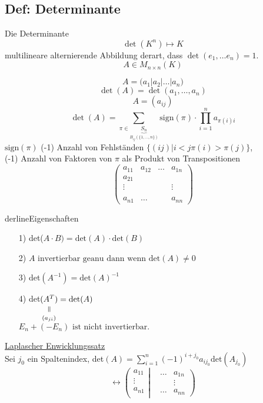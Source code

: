 \documentclass[titlepage,12pt,a4paper,ngerman]{report}
\newcommand{\verteq}{\rotatebox{90}{$\,=$}}
\newcommand{\equalto}[2]{\underset{\scriptstyle\overset{\mkern4mu\verteq}{#2}}{#1}}
\newcommand{\tx}[1]{\textrm{#1}}
\begin{document}
\subsection{Def: Determinante} Die Determinante $$\det(K^n) \mapsto K$$ multilineare alternierende Abbildung derart, dass $\det(e_1,\dots e_n) = 1$.
$$A\in M_{n\times n}(K)$$

$$A  = \Bigg( a_1 \bigg\vert a_2\bigg\vert \dots \bigg\vert a_n\Bigg) $$
$$ \det(A) = \det(a_1,\dots , a_n)$$
$$A=(a_{ij})$$
$$\det(A) = \sum_{\pi \in \underbrace{S_n}_{B_{ij}(\{1,\dots ,n\})}} \tx{sign}(\pi) \cdot \prod _{i = 1}^n a_{\pi(i)i}$$
$\tx{sign}(\pi)$ (-1) Anzahl von Fehlständen $\{(ij)\vert i<j \pi(i) >\pi(j)\}$, \\
(-1) Anzahl von Faktoren von $\pi$ als Produkt von Transpositionen\\


$$\begin{pmatrix}
a_{11} & a_{12} & \dots & a_{1n} \\
a_{21} &  &  &  \\
\vdots &  &  & \vdots \\
&  &  &  \\
a_{n1} & \dots &  & a_{nn} 
\end{pmatrix}$$

derline{Eigenschaften}\\
\begin{itemize}
	\item[1)] det($A \cdot B) = \textrm{det}(A) \cdot \textrm{det}(B)$
	\item[2)] $A \textrm{ invertierbar geanu dann wenn det}(A) \neq 0$
	\item[3)] det$(A^{-1}) = \textrm{det}(A)^{-1}$
	\item[4)] det$\equalto{(A^T)}{(a_{ji})} = \textrm{det} (A)$\\$E_n + (-E_n) \textrm{ ist nicht invertierbar.}$
\end{itemize}
\underline{Laplascher Enwicklungssatz}\\
Sei $j_0$ ein Spaltenindex, det$(A) = \sum_{i=1}^n (-1)^{i+j_0} a_{ij_0} \textrm{det}(A_{j_0})$\\

$$\leftrightarrow
\left(\begin{matrix}
a_{11} \\
\vdots \\
a_{n1} \\
\end{matrix}
\right| \left.
\begin{matrix}
&  \dots & a_{1n} \\
&  & \vdots \\
&  \dots & a_{nn}
\end{matrix} \right)$$
\end{document}
